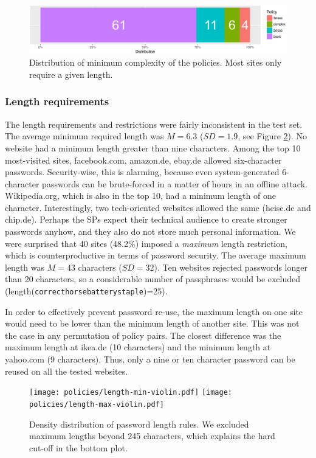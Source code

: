 \begin{figure}[tbph]
	\centering
	\includegraphics[width=\linewidth]{figures/policies/policies-distribution-edited-v2}
	\caption{\label{fig:policies_reuse:policies-distribution-edited}Distribution of minimum complexity of the policies. Most sites only require a given length.}
\end{figure}

\subsubsection{Length requirements} 
The length requirements and restrictions were fairly inconsistent in the test set. The average minimum required length was $M=6.3$ ($SD=1.9$, see Figure \ref{fig:policies_reuse:min-max-length}). No website had a minimum length greater than nine characters. Among the top 10 most-visited sites, facebook.com, amazon.de, ebay.de allowed six-character passwords. Security-wise, this is alarming, because even system-generated 6-character passwords can be brute-forced in a matter of hours in an offline attack. Wikipedia.org, which is also in the top 10, had a minimum length of one character. Interestingly, two tech-oriented websites allowed the same (heise.de and chip.de). Perhaps the \glspl{SP} expect their technical audience to create stronger passwords anyhow, and they also do not store much personal information. 
We were surprised that 40 sites (48.2\%) imposed a \textit{maximum} length restriction, which is counterproductive in terms of password security. The average maximum length was $M=43$ characters ($SD=32$). Ten websites rejected passwords longer than 20 characters, so a considerable number of passphrases would be excluded (length(\texttt{correcthorsebatterystaple})=25). 

In order to effectively prevent password re-use, the maximum length on one site would need to be lower than the minimum length of another site. This was not the case in any permutation of policy pairs. The closest difference was the maximum length at ikea.de (10 characters) and the minimum length at yahoo.com (9 characters). Thus, only a nine or ten character password can be reused on all the tested websites. 
\begin{figure}[tbph]
	\centering
	\texttt{[image: policies/length-min-violin.pdf]}
	\texttt{[image: policies/length-max-violin.pdf]}
	\caption{\label{fig:policies_reuse:min-max-length}Density distribution of password length rules. We excluded maximum lengths beyond 245 characters, which explains the hard cut-off in the bottom plot.}
\end{figure}

